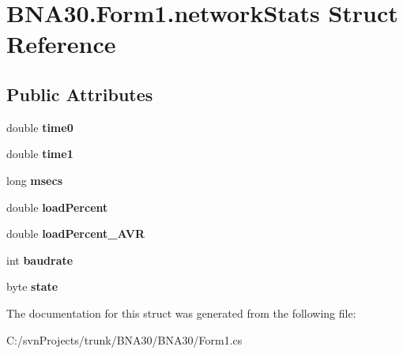 \hypertarget{struct_b_n_a30_1_1_form1_1_1network_stats}{}\section{B\+N\+A30.\+Form1.\+network\+Stats Struct Reference}
\label{struct_b_n_a30_1_1_form1_1_1network_stats}
\subsection*{Public Attributes}
\begin{DoxyCompactItemize}
\item 
\mbox{\label{struct_b_n_a30_1_1_form1_1_1network_stats_ae9e007638846bc9c3a6468a794be5859}} 
double {\bfseries time0}
\item 
\mbox{\label{struct_b_n_a30_1_1_form1_1_1network_stats_a8b7f72d2c216139698ad796b25b6986a}} 
double {\bfseries time1}
\item 
\mbox{\label{struct_b_n_a30_1_1_form1_1_1network_stats_a836597b5d82a2f66f88a0d4200248a7e}} 
long {\bfseries msecs}
\item 
\mbox{\label{struct_b_n_a30_1_1_form1_1_1network_stats_a72612e17dbb74f078fad1a3cb84b7f30}} 
double {\bfseries load\+Percent}
\item 
\mbox{\label{struct_b_n_a30_1_1_form1_1_1network_stats_a1255664a023e2d7e9360934b271e41d1}} 
double {\bfseries load\+Percent\+\_\+\+A\+VR}
\item 
\mbox{\label{struct_b_n_a30_1_1_form1_1_1network_stats_a4a33b5e583a238fe8dde945c497f656e}} 
int {\bfseries baudrate}
\item 
\mbox{\label{struct_b_n_a30_1_1_form1_1_1network_stats_afc48d97d95f6565f94fae6c68427f7b8}} 
byte {\bfseries state}
\end{DoxyCompactItemize}


The documentation for this struct was generated from the following file\+:\begin{DoxyCompactItemize}
\item 
C\+:/svn\+Projects/trunk/\+B\+N\+A30/\+B\+N\+A30/Form1.\+cs\end{DoxyCompactItemize}
